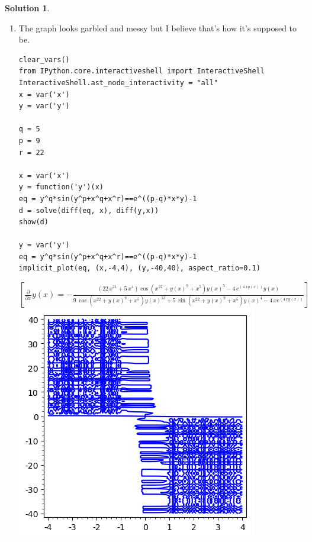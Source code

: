 \documentclass[10pt]{article}
\makeatletter
\theoremstyle{definition}
\newtheorem{soln}{Solution}
\newcommand{\boxspacing}{\kern\kvtcb@left@rule\kern\kvtcb@boxsep}
\newcommand{\prompt}[4]{
    \ttfamily\llap{{\color{#2}[#3]:\hspace{3pt}#4}}\vspace{-\baselineskip}
}
\makeatother
\begin{document}
\begin{soln} ~\\
  \begin{enumerate}[label=(\alph*)]
    \item The graph looks garbled and messy but I believe that's how it's supposed to be.
          \begin{tcolorbox}[breakable, size=fbox, boxrule=1pt, pad at break*=1mm,colback=cellbackground, colframe=cellborder]
            \prompt{In}{incolor}{1}{\boxspacing}
            \begin{verbatim}
clear_vars()
from IPython.core.interactiveshell import InteractiveShell
InteractiveShell.ast_node_interactivity = "all"
x = var('x')
y = var('y')

q = 5
p = 9
r = 22

x = var('x')
y = function('y')(x)
eq = y^q*sin(y^p+x^q+x^r)==e^((p-q)*x*y)-1
d = solve(diff(eq, x), diff(y,x))
show(d)

y = var('y')
eq = y^q*sin(y^p+x^q+x^r)==e^((p-q)*x*y)-1
implicit_plot(eq, (x,-4,4), (y,-40,40), aspect_ratio=0.1)
                      \end{verbatim}
          \end{tcolorbox}
          \begin{tcolorbox}[breakable, size=fbox, boxrule=.5pt, pad at break*=1mm, opacityfill=0]
            \prompt{Out}{outcolor}{1}{\boxspacing}
            $\displaystyle\left[\frac{\partial}{\partial x}y\left(x\right) = -\frac{{\left(22 \, x^{21} + 5 \, x^{4}\right)} \cos\left(x^{22} + y\left(x\right)^{9} + x^{5}\right) y\left(x\right)^{5} - 4 \, e^{\left(4 \, x y\left(x\right)\right)} y\left(x\right)}{9 \, \cos\left(x^{22} + y\left(x\right)^{9} + x^{5}\right) y\left(x\right)^{13} + 5 \, \sin\left(x^{22} + y\left(x\right)^{9} + x^{5}\right) y\left(x\right)^{4} - 4 \, x e^{\left(4 \, x y\left(x\right)\right)}}\right]$\\
            \includegraphics[scale=0.75]{G1.png}
            

\end{tcolorbox}
\end{enumerate}
\end{soln}
\end{document}
